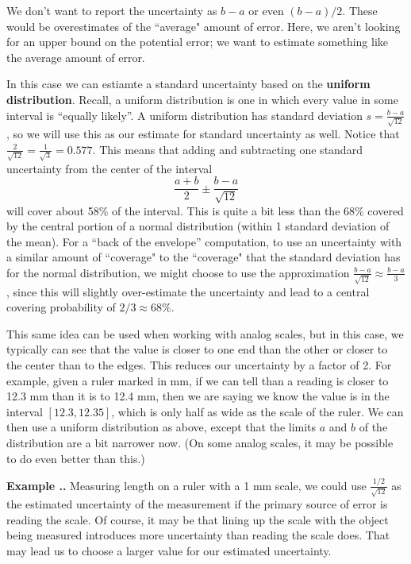 \documentclass[twoside]{book}\usepackage[]{graphicx}\usepackage[]{xcolor}
\def\term#1{\textbf{#1}}
\newcounter{example}[section]
\newenvironment{example}%
{\refstepcounter{example}%
\textbf{Example \thesection.\arabic{example}. }}%
{}
\begin{document}
We don't want to report the uncertainty as $b-a$ or even $(b-a)/2$.  These would be
overestimates of the ``average" amount of error.
Here, we aren't looking for an upper bound on the potential error; we want to estimate something 
like the average amount of error.

In this case we can estiamte a standard uncertainty based on the \term{uniform distribution}.  
Recall, a uniform
distribution is one in which every value in some interval is ``equally likely''.
A uniform distribution has standard deviation $s = \frac{b-a}{\sqrt{12}}$, so we will
use this as our estimate for standard uncertainty as well.
Notice that 
$\frac{2}{\sqrt{12}} = \frac{1}{\sqrt{3}} = 0.577 $.
This means that adding and subtracting one standard uncertainty from the center 
of the interval
\[
\frac{a+b}{2} \pm \frac{b-a}{\sqrt{12}}
\]
will cover about 58\% of the interval.  
This is quite a bit less than the 68\% covered by the central portion of a normal 
distribution (within 1 standard deviation of the mean).
For a ``back of the envelope'' computation, to use an uncertainty with a similar amount of ``coverage" to the ``coverage" that the standard deviation has for the normal distribution, we might choose to use the approximation 
$\frac{b-a}{\sqrt{12}} \approx \frac{b-a}{3}$,
since this will slightly over-estimate the uncertainty and lead to a central covering
probability of $2/3 \approx 68\%$.

This same idea can be used when working with analog scales, but in this case, we typically
can see that the value is closer to one end than the other or closer to the center than
to the edges.  This reduces our uncertainty by a factor of 2.  For example, given a ruler
marked in mm, if we can tell than a reading is closer to 12.3 mm than it is to 12.4 mm, then we 
are saying we know the value is in the interval $[12.3, 12.35]$, which is only half as 
wide as the scale of the ruler.  We can then use a uniform distribution as above, except that the limits $a$ and $b$ of the distribution are a bit narrower now.  
(On some analog scales, it may be possible to do even better than this.)

\begin{example}
Measuring length on a ruler with a 1 mm scale, we could use $\frac{1/2}{\sqrt{12}}$
as the estimated uncertainty of the measurement if the primary source of error is reading
the scale.  Of course, it may be that lining up the scale with the object being measured
introduces more uncertainty than reading the scale does.  That may lead us to choose a 
larger value for our estimated uncertainty.
\end{example}
\end{document}
